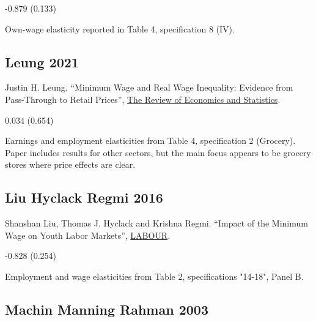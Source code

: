 \vspace{0.7em}

 -0.879 (0.133)

\vspace{0.7em}

 Own-wage elasticity reported in Table 4, specification 8 (IV).

\subsection*{Leung 2021}
\vspace{-0.7em}

\noindent Justin H. Leung. ``Minimum Wage and Real Wage Inequality: Evidence from Pass-Through to Retail Prices'', \href{https://doi.org/10.1162/rest_a_00915}{The Review of Economics and Statistics}.

\vspace{0.7em}

 0.034 (0.654)

\vspace{0.7em}

 Earnings and employment elasticities from Table 4, specification 2 (Grocery). Paper includes results for other sectors, but the main focus appears to be grocery stores where price effects are clear.

\subsection*{Liu Hyclack Regmi 2016}
\vspace{-0.7em}

\noindent Shanshan Liu, Thomas J. Hyclack and Krishna Regmi. ``Impact of the Minimum Wage on Youth Labor Markets'', \href{https://doi.org/10.1111/labr.12071}{LABOUR}.

\vspace{0.7em}

 -0.828 (0.254)

\vspace{0.7em}

 Employment and wage elasticities from Table 2, specifications "14-18", Panel B.

\subsection*{Machin Manning Rahman 2003}
\vspace{-0.7em}


